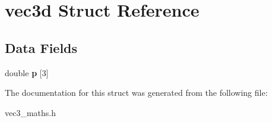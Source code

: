 \hypertarget{structvec3d}{}\section{vec3d Struct Reference}
\label{structvec3d}
\subsection*{Data Fields}
\begin{DoxyCompactItemize}
\item 
double {\bfseries p} \mbox{[}3\mbox{]}\hypertarget{structvec3d_ad5f89363e79a9651508abe9afa99863e}{}\label{structvec3d_ad5f89363e79a9651508abe9afa99863e}

\end{DoxyCompactItemize}


The documentation for this struct was generated from the following file\+:\begin{DoxyCompactItemize}
\item 
vec3\+\_\+maths.\+h\end{DoxyCompactItemize}
